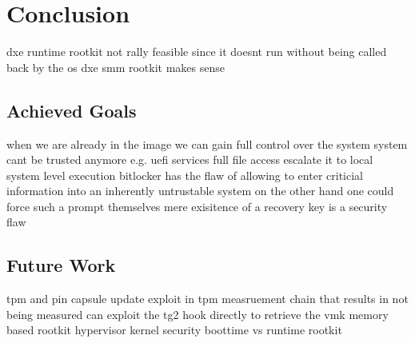 
\chapter{Conclusion}

dxe runtime rootkit not rally feasible since it doesnt run without being called back by the os
dxe smm rootkit makes sense

\section{Achieved Goals}
when we are already in the image we can gain full control over the system
system cant be trusted anymore e.g. uefi services
full file access
escalate it to local system level execution
bitlocker has the flaw of allowing to enter criticial information into an inherently untrustable system
on the other hand one could force such a prompt themselves
mere exisitence of a recovery key is a security flaw

\section{Future Work}
tpm and pin
capsule update
exploit in tpm measruement chain that results in not being measured
can exploit the tg2 hook directly to retrieve the vmk
memory based rootkit
hypervisor kernel security
boottime vs runtime rootkit